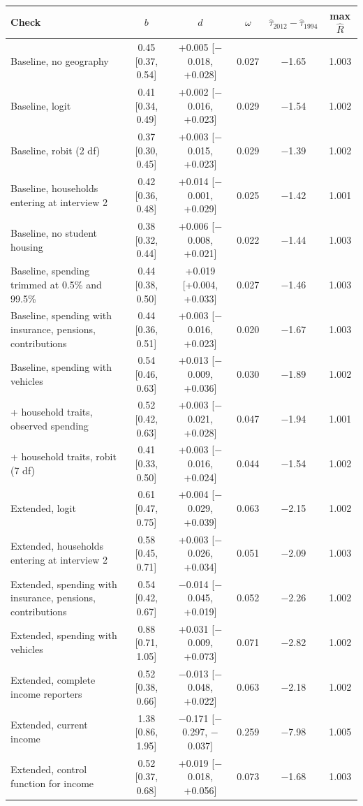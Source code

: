 \footnotesize
\begin{tabular}{lccccc}
\toprule
Check & $b$ & $d$ & $\omega$ & $\hat\tau_{2012}-\hat\tau_{1994}$ & max $\hat R$ \\
\midrule
Baseline, no geography & 0.45 [0.37, 0.54] & +0.005 [$-$0.018, +0.028] & 0.027 & $-$1.65 & 1.003 \\
Baseline, logit & 0.41 [0.34, 0.49] & +0.002 [$-$0.016, +0.023] & 0.029 & $-$1.54 & 1.002 \\
Baseline, robit (2 df) & 0.37 [0.30, 0.45] & +0.003 [$-$0.015, +0.023] & 0.029 & $-$1.39 & 1.002 \\
Baseline, households entering at interview 2 & 0.42 [0.36, 0.48] & +0.014 [$-$0.001, +0.029] & 0.025 & $-$1.42 & 1.001 \\
Baseline, no student housing & 0.38 [0.32, 0.44] & +0.006 [$-$0.008, +0.021] & 0.022 & $-$1.44 & 1.003 \\
Baseline, spending trimmed at 0.5\% and 99.5\% & 0.44 [0.38, 0.50] & +0.019 [+0.004, +0.033] & 0.027 & $-$1.46 & 1.003 \\
Baseline, spending with insurance, pensions, contributions & 0.44 [0.36, 0.51] & +0.003 [$-$0.016, +0.023] & 0.020 & $-$1.67 & 1.003 \\
Baseline, spending with vehicles & 0.54 [0.46, 0.63] & +0.013 [$-$0.009, +0.036] & 0.030 & $-$1.89 & 1.002 \\
+ household traits, observed spending & 0.52 [0.42, 0.63] & +0.003 [$-$0.021, +0.028] & 0.047 & $-$1.94 & 1.001 \\
+ household traits, robit (7 df) & 0.41 [0.33, 0.50] & +0.003 [$-$0.016, +0.024] & 0.044 & $-$1.54 & 1.002 \\
Extended, logit & 0.61 [0.47, 0.75] & +0.004 [$-$0.029, +0.039] & 0.063 & $-$2.15 & 1.002 \\
Extended, households entering at interview 2 & 0.58 [0.45, 0.71] & +0.003 [$-$0.026, +0.034] & 0.051 & $-$2.09 & 1.003 \\
Extended, spending with insurance, pensions, contributions & 0.54 [0.42, 0.67] & $-$0.014 [$-$0.045, +0.019] & 0.052 & $-$2.26 & 1.002 \\
Extended, spending with vehicles & 0.88 [0.71, 1.05] & +0.031 [$-$0.009, +0.073] & 0.071 & $-$2.82 & 1.002 \\
Extended, complete income reporters & 0.52 [0.38, 0.66] & $-$0.013 [$-$0.048, +0.022] & 0.063 & $-$2.18 & 1.002 \\
Extended, current income & 1.38 [0.86, 1.95] & $-$0.171 [$-$0.297, $-$0.037] & 0.259 & $-$7.98 & 1.005 \\
Extended, control function for income & 0.52 [0.37, 0.68] & +0.019 [$-$0.018, +0.056] & 0.073 & $-$1.68 & 1.003 \\
\bottomrule
\end{tabular}
